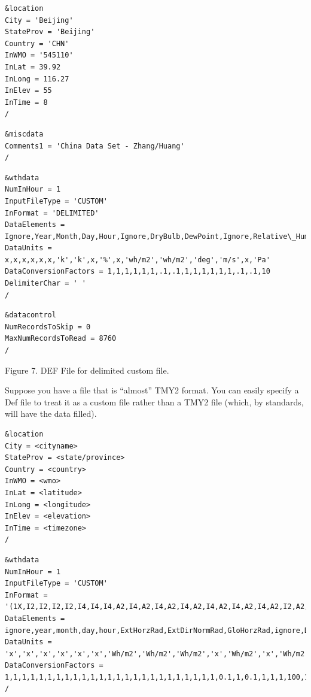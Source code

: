 \begin{lstlisting}
&location
City = 'Beijing'
StateProv = 'Beijing'
Country = 'CHN'
InWMO = '545110'
InLat = 39.92
InLong = 116.27
InElev = 55
InTime = 8
/
\end{lstlisting}

\begin{lstlisting}
&miscdata
Comments1 = 'China Data Set - Zhang/Huang'
/
\end{lstlisting}

\begin{lstlisting}
&wthdata
NumInHour = 1
InputFileType = 'CUSTOM'
InFormat = 'DELIMITED'
DataElements = Ignore,Year,Month,Day,Hour,Ignore,DryBulb,DewPoint,Ignore,Relative\_Humidity,Ignore,DirNorRad,DifHorRad,WindDir,Wind\_Speed,OpaqSkyCvr,Atmos\_Pressure
DataUnits = x,x,x,x,x,x,'k','k',x,'%',x,'wh/m2','wh/m2','deg','m/s',x,'Pa'
DataConversionFactors = 1,1,1,1,1,1,.1,.1,1,1,1,1,1,1,.1,.1,10
DelimiterChar = ' '
/
\end{lstlisting}

\begin{lstlisting}
&datacontrol
NumRecordsToSkip = 0
MaxNumRecordsToRead = 8760
/
\end{lstlisting}

Figure 7. DEF File for delimited custom file.

Suppose you have a file that is ``almost'' TMY2 format. You can easily specify a Def file to treat it as a custom file rather than a TMY2 file (which, by standards, will have the data filled).

\begin{lstlisting}
&location
City = <cityname>
StateProv = <state/province>
Country = <country>
InWMO = <wmo>
InLat = <latitude>
InLong = <longitude>
InElev = <elevation>
InTime = <timezone>
/
\end{lstlisting}

\begin{lstlisting}
&wthdata
NumInHour = 1
InputFileType = 'CUSTOM'
InFormat = '(1X,I2,I2,I2,I2,I4,I4,I4,A2,I4,A2,I4,A2,I4,A2,I4,A2,I4,A2,I4,A2,I2,A2,I2,A2,I4,A2,I4,A2,I3,A2,I4,A2,I3,A2,I3,A2,I4,A2,I5,A2,I1,A9,I3,A2,I3,A2,I3,A2,I2,A2)'
DataElements = ignore,year,month,day,hour,ExtHorzRad,ExtDirNormRad,GloHorzRad,ignore,DirNormRad,ignore,DifHorzRad,ignore,GloHorzIllum,ignore,DirNormIllum,ignore,DifHorzIllum,ignore,ZenithLum,ignore,ignore,ignore,ignore,ignore,DryBulb,ignore,DewPoint,ignore,RelHumid,ignore,Pressure,ignore,WindDir,ignore,WindSpd,ignore,Visibility,ignore,CeilHgt,ignore,ObsIndicator,WeatherCodes,PrecWtr,ignore,AerOptDepth,ignore,SnowDepth,ignore,DaysSnow,ignore
DataUnits = 'x','x','x','x','x','x','Wh/m2','Wh/m2','Wh/m2','x','Wh/m2','x','Wh/m2','x','lux','x','lux','x','lux','x','Cd/m2','x','x','x','x','x','C','x','C','x','%','x','x','x','deg','x','m/s','x','x','x','x','x','x','x','x','x','x','x','x','x','x','x'
DataConversionFactors = 1,1,1,1,1,1,1,1,1,1,1,1,1,1,1,1,1,1,1,1,1,1,1,1,1,0.1,1,0.1,1,1,1,100,1,1,1,0.1,1,1,1,1,1,1,1,1,1,1,1,1,1,1,1
/
\end{lstlisting}

